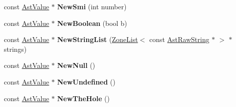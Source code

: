 \begin{DoxyCompactItemize}
\item 
const \hyperlink{classv8_1_1internal_1_1_ast_value}{Ast\+Value} $\ast$ {\bfseries New\+Smi} (int number)\hypertarget{classv8_1_1internal_1_1_ast_value_factory_a946e0af513192f073660d80e03a904d8}{}\label{classv8_1_1internal_1_1_ast_value_factory_a946e0af513192f073660d80e03a904d8}

\item 
const \hyperlink{classv8_1_1internal_1_1_ast_value}{Ast\+Value} $\ast$ {\bfseries New\+Boolean} (bool b)\hypertarget{classv8_1_1internal_1_1_ast_value_factory_ae03a5d1347d22306588b0e5709ccfc82}{}\label{classv8_1_1internal_1_1_ast_value_factory_ae03a5d1347d22306588b0e5709ccfc82}

\item 
const \hyperlink{classv8_1_1internal_1_1_ast_value}{Ast\+Value} $\ast$ {\bfseries New\+String\+List} (\hyperlink{classv8_1_1internal_1_1_zone_list}{Zone\+List}$<$ const \hyperlink{classv8_1_1internal_1_1_ast_raw_string}{Ast\+Raw\+String} $\ast$ $>$ $\ast$strings)\hypertarget{classv8_1_1internal_1_1_ast_value_factory_a903364929e3ecbb55a095dee48bfd7f9}{}\label{classv8_1_1internal_1_1_ast_value_factory_a903364929e3ecbb55a095dee48bfd7f9}

\item 
const \hyperlink{classv8_1_1internal_1_1_ast_value}{Ast\+Value} $\ast$ {\bfseries New\+Null} ()\hypertarget{classv8_1_1internal_1_1_ast_value_factory_a93026a40389b24fda775956f218248b8}{}\label{classv8_1_1internal_1_1_ast_value_factory_a93026a40389b24fda775956f218248b8}

\item 
const \hyperlink{classv8_1_1internal_1_1_ast_value}{Ast\+Value} $\ast$ {\bfseries New\+Undefined} ()\hypertarget{classv8_1_1internal_1_1_ast_value_factory_a8822771d32f8a55049f7698cc936b495}{}\label{classv8_1_1internal_1_1_ast_value_factory_a8822771d32f8a55049f7698cc936b495}

\item 
const \hyperlink{classv8_1_1internal_1_1_ast_value}{Ast\+Value} $\ast$ {\bfseries New\+The\+Hole} ()\hypertarget{classv8_1_1internal_1_1_ast_value_factory_acb9d0ab346a47b869034be56f9fda62d}{}\label{classv8_1_1internal_1_1_ast_value_factory_acb9d0ab346a47b869034be56f9fda62d}

\end{DoxyCompactItemize}
